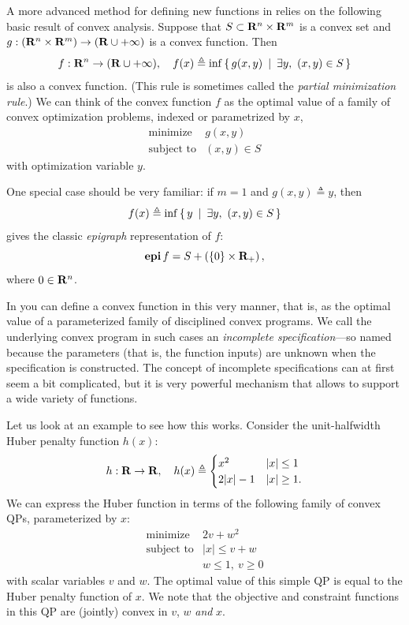 \documentclass[12pt]{article}
\begin{document}
A more advanced method for defining new functions in \cvx
relies on the following basic result of convex analysis.
Suppose that $S\subset\R^n\times\R^m$ is a convex set and 
$g:(\R^n\times\R^m)\rightarrow(\R\cup+\infty)$ is a convex function. 
Then
\begin{equation}
	\label{eq:partial}
	f:\R^n\rightarrow(\R\cup+\infty), \quad 
f(x) \triangleq \inf\Condset{g(x,y)}{\exists y,~(x,y)\in S }
\end{equation}
is also a convex function. (This rule is sometimes called
the \emph{partial minimization rule}.)
We can think of the convex function $f$ as the optimal value of
a family of convex optimization problems, indexed or parametrized
by $x$,
\[
\begin{array}{ll}
\mbox{minimize} & g(x,y) \\
\mbox{subject to} & (x,y) \in S
\end{array}
\]
with optimization variable $y$.

One special case should be very familiar: if $m=1$ and
$g(x,y)\triangleq y$, then
\[
	f(x) \triangleq \inf\left\{\,y\,~|~\,\exists y,~(x,y)\in S\,\right\}
\]
gives the classic \emph{epigraph} representation of $f$:
\[
\operatorname{\textbf{epi}} f = S+ \left( \{ 0 \} \times \mathbf{R}_+ \right),
\]
where $0 \in \mathbf{R}^n$.

In \cvx you can define a convex
function in this very manner, that is, as the optimal value of a 
parameterized family of disciplined convex programs. 
We call the underlying convex program in such cases
an \emph{incomplete specification}---so named because
the parameters (that is, the function inputs)
are unknown when the specification is
constructed. The concept of incomplete 
specifications can at first seem a bit complicated,
but it is very powerful mechanism that allows \cvx
to support a wide variety of functions.

Let us look at an example to see how this works.
Consider the unit-halfwidth Huber penalty function $h(x)$:
\begin{equation}
	h:\R\rightarrow\R, \quad h(x) \eqbydef 
\Cases{ x^2 & |x| \leq 1 \\ 2|x|-1 & |x| \geq 1 .}
\end{equation}
We can express the Huber function in terms of the following family of 
convex QPs, parameterized by $x$:
\begin{equation}
	\begin{array}{ll}
		\text{minimize}   & 2 v + w^2 \\
		\text{subject to} & | x | \leq v + w \\
		                  & w \leq 1, ~ v \geq 0
	\end{array}
\end{equation}
with scalar variables $v$ and $w$.
The optimal value of this simple QP is equal to the Huber
penalty function of $x$.
We note that the objective and constraint functions in this QP are
(jointly) convex in $v$, $w$ \emph{and} $x$.
\end{document}
